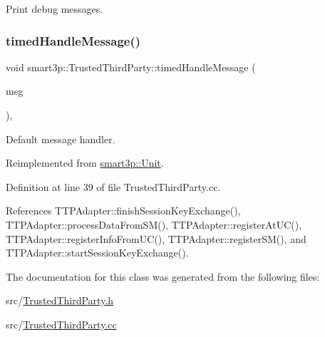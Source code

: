 Print debug messages. 

\mbox{\label{classsmart3p_1_1TrustedThirdParty_adedb95022442b9c7f2bc1de5f4c17a76}} 
\subsubsection{\texorpdfstring{timed\+Handle\+Message()}{timedHandleMessage()}}
{\footnotesize\ttfamily void smart3p\+::\+Trusted\+Third\+Party\+::timed\+Handle\+Message (\begin{DoxyParamCaption}\item[{c\+Message $\ast$}]{msg }\end{DoxyParamCaption})\hspace{0.3cm}{\ttfamily [protected]}, {\ttfamily [virtual]}}



Default message handler. 



Reimplemented from \hyperlink{classsmart3p_1_1Unit_a93f16f43dec69d23d8588f3b60c96d69}{smart3p\+::\+Unit}.



Definition at line 39 of file Trusted\+Third\+Party.\+cc.



References T\+T\+P\+Adapter\+::finish\+Session\+Key\+Exchange(), T\+T\+P\+Adapter\+::process\+Data\+From\+S\+M(), T\+T\+P\+Adapter\+::register\+At\+U\+C(), T\+T\+P\+Adapter\+::register\+Info\+From\+U\+C(), T\+T\+P\+Adapter\+::register\+S\+M(), and T\+T\+P\+Adapter\+::start\+Session\+Key\+Exchange().



The documentation for this class was generated from the following files\+:\begin{DoxyCompactItemize}
\item 
src/\hyperlink{TrustedThirdParty_8h}{Trusted\+Third\+Party.\+h}\item 
src/\hyperlink{TrustedThirdParty_8cc}{Trusted\+Third\+Party.\+cc}\end{DoxyCompactItemize}
